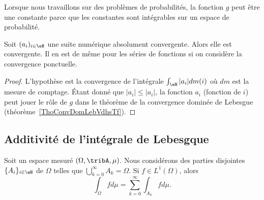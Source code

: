 \begin{remark}
    Lorsque nous travaillons sur des problèmes de probabilités, la fonction \( g\) peut être une constante parce que les constantes sont intégrables sur un espace de probabilité.
\end{remark}

\begin{corollary}       \label{CorCvAbsNormwEZdRc}
    Soit \( (a_i)_{i\in \eN}\) une suite numérique absolument convergente. Alors elle est convergente. Il en est de même pour les séries de fonctions si on considère la convergence ponctuelle.
\end{corollary}

\begin{proof}
    L'hypothèse est la convergence de l'intégrale \( \int_{\eN}| a_i |dm(i)\) où \( dm\) est la mesure de comptage. Étant donné que \( | a_i |\leq | a_i |\), la fonction \( a_i\) (fonction de \( i\)) peut jouer le rôle de \( g\) dans le théorème de la convergence dominée de Lebesgue (théorème~\ref{ThoConvDomLebVdhsTf}).
\end{proof}

\subsection{Additivité de l'intégrale de Lebesgque}

\begin{proposition}     \label{PROPooDWYNooWKJmEV}
    Soit un espace mesuré \( (\Omega,\tribA,\mu)\). Nous considérons des parties disjointes \( \{ A_i \}_{i\in \eN}\) de \( \Omega\) telles que \( \bigcup_{k=0}^{\infty}A_k=\Omega\). Si \( f\in L^1(\Omega)\), alors
    \begin{equation}
        \int_{\Omega}fd\mu=\sum_{k=0}^{\infty}\int_{A_k}fd\mu.
    \end{equation}
\end{proposition}

